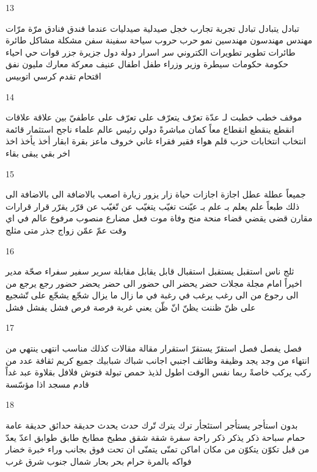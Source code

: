 \documentclass[twocolumn,a4paper]{article}
\begin{document}
13

\textarabic{ تبادل  يتبادل  
 تبادل  
 تجربة  تجارب  
 خجل  
 صيدلية  صيدليات
 عندما  
 فندق  فنادق  
 مرّة  مرّات
 مهندس  مهندسون
  مهندسين
  نمو  
 حرب  حروب  
 سياحة  
 سفينة  سفن  
 مشكلة  مشاكل  
 طائرة  طائرات
 تطوير  تطويرات
 الكتروني  
  سر  اسرار  
 دولة  دول  
 جزيرة  جزر  
 قوات  
 حي  احياء  
 حكومة  حكومات
 سيطرة  
 وزير  وزراء  
 طفل  اطفال  
 عنيف  
 معركة  معارك  
 مليون  
 نفق  
 اقتحام  
 تقدم  
 كرسي  
 اتوبيس  
}

14

\textarabic{ موقف  
 خطب  خطبت لـ  
 عدّة  
 تعرّف  يتعرّف على  
 تعرّف على  
 عاطفيّ  
 بين  
 علاقة  علاقات
 انقطع  ينقطع  
 انقطاع  
 معاً  
 كمان  
 مباشرةً  
 دولي  
 رئيس  
 عالم  علماء  
 ناجح  
 استثمار  
 قائمة  
 انتخاب  انتخابات
 حزب  
 قلم  
 هواء  
 فقير  فقراء   
 غاني  
 خروف  
 ماعز  
 بقرة  ابقار  
 أخذ  يأخذ  
 اخذ  
 اخر  
 بقي  يبقى  
 بقاء  
}

15

\textarabic{ جميعاً  
 عطلة  عطل  
 اجازة  اجازات
 حياة  
 زار  يزور  
 زيارة  
 اصعب  
 باﻻضافة الى  
 باﻻضافة الى ذلك  
 طبعاً  
 علم  يعلم بـ  
 علم بـ  
 عيّنت  
 تغيّب  يتغيّب عن  
 تّغيّب عن  
 قرّر  يقرّر  
 قرار  قرارات
 مقارن  
 قضى  يقضي  
 قضاء  
 منحة  منح  
 وفاة  
 موت  
 فعل مضارع  
 منصوب  
 مرفوع  
 عالم  
 في اي وقت  
 عمّ  
 عمّن 
 زواج  
 جذر  
 متى  
 مثلج  
}

16

\textarabic{ ثلج  
 ناس  
 استقبل  يستقبل  
 استقبال  
 قابل  يقابل  
 مقابلة  
 سرير  
 سفير  سفراء  
 صحّة  
 مدير  
 اخيراً  
 امام  
 مجلة  مجلات
 حضر  يحضر الى  
 حضور الى  
 حضر  يحضر  
 حضور  
 رجع  يرجع من  الى  
 رجوع من  الى  
 رغب  يرغب في  
 رغبة في  
 ما زال  ما يزال  
 شجّع  يشجّع على  
 تّشجيع على  
 ظنّ  ظننت  يظنّ انّ  
 ظّن  
 يعني  
 غربة  
 فرصة  فرص  
 فشل  يفشل  
 فشل  
}

17

\textarabic{ فصل  يفصل  
 فصل  
 استقرّ  يستقرّ  
 استقرار  
 مقالة  مقالات
 كذلك  
 مناسب  
 انتهى  ينتهي من  
 انتهاء من  
 وجد  يجد  
 وظيفة  وظائف  
 اجنبي  اجانب  
 شباك  شبابيك  
 جميع  
 كريم  
 ثقافة  
 عدد من  
 ركب  يركب  
 خاصةً  
 ربما  
 نفس الوقت  
 اطول  
 لذيذ  
 حمص  
 تبولة  
 فتوش  
 فلافل  
 بقلاوة  
 عبد  
 غداً  
 قادم  
 مسجد  
 اذا  
 مؤسّسة  
}

18

\textarabic{ بدون  
 استأجر  يستأجر  
 استئجأر  
 ترك  يترك  
 تّرك  
 حدث  يحدث  
 حديقة  حدائق  
 حديقة عامة  
 حمام سباحة  
 ذكر  يذكر  
 ذكر  
 راحة  
 سفرة  
 شقة  شقق 
 مطبخ  مطابخ  
 طابق  طوابق  
 اعدّ  يعدّ  
 من قبل  
 تكوّن  يتكوّن من  
 مكان  اماكن  
 تمنّى  يتمنّى ان  
 تحت  
 فوق  
 بجانب  
 وراء  
 خبرة  
 خضار  
 فواكه  
 بالمرة  
 حرام  
 بحر  بحار  
 شمال  
 جنوب  
 شرق  
 غرب  
}
\end{document}
